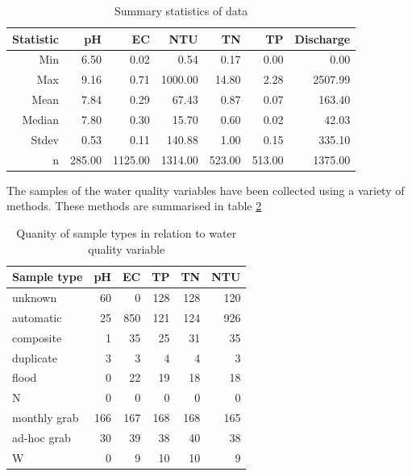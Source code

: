 \documentclass[5p]{elsarticle}
\begin{document}
\begin{table}[ht]
\begin{center}
\caption{Summary statistics of data}
\begin{tiny}
\begin{tabular}{rrrrrrr}
  \hline
Statistic & pH & EC & NTU & TN & TP & Discharge \\ 
  \hline
Min & 6.50 & 0.02 & 0.54 & 0.17 & 0.00 & 0.00 \\ 
  Max & 9.16 & 0.71 & 1000.00 & 14.80 & 2.28 & 2507.99 \\ 
  Mean & 7.84 & 0.29 & 67.43 & 0.87 & 0.07 & 163.40 \\ 
  Median & 7.80 & 0.30 & 15.70 & 0.60 & 0.02 & 42.03 \\ 
  Stdev & 0.53 & 0.11 & 140.88 & 1.00 & 0.15 & 335.10 \\ 
  n & 285.00 & 1125.00 & 1314.00 & 523.00 & 513.00 & 1375.00 \\ 
   \hline
\end{tabular}
\end{tiny}
\label{table:summary_stats}
\end{center}
\end{table}
The samples of the water quality variables have been collected using a variety of methods. These methods are summarised in table \ref{table:sample_types}

\begin{table}[ht]
\begin{center}
\caption{Quanity of sample types in relation to water quality variable}
\begin{tabular}{lrrrrr}
  \hline
 Sample type & pH & EC & TP & TN & NTU \\ 
  \hline
  unknown &  60 &   0 & 128 & 128 & 120 \\ 
  automatic &  25 & 850 & 121 & 124 & 926 \\ 
  composite &   1 &  35 &  25 &  31 &  35 \\ 
  duplicate &   3 &   3 &   4 &   4 &   3 \\ 
  flood &   0 &  22 &  19 &  18 &  18 \\ 
  N &   0 &   0 &   0 &   0 &   0 \\ 
  monthly grab & 166 & 167 & 168 & 168 & 165 \\ 
  ad-hoc grab &  30 &  39 &  38 &  40 &  38 \\ 
  W &   0 &   9 &  10 &  10 &   9 \\ 
   \hline
\end{tabular}
\label{table:sample_types}
\end{center}
\end{table}
\end{document}
